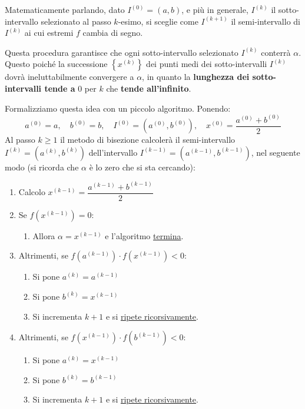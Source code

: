 \highspace
Matematicamente parlando, dato $I^{(0)} = \left(a,b\right)$, e più in generale, $I^{(k)}$ il sotto-intervallo selezionato al passo $k$-esimo, si sceglie come $I^{\left(k+1\right)}$ il semi-intervallo di $I^{(k)}$ ai cui estremi $f$ cambia di segno.

\highspace
Questa procedura garantisce che ogni sotto-intervallo selezionato $I^{(k)}$ conterrà $\alpha$. Questo poiché la successione $\left\{x^{(k)}\right\}$ dei punti medi dei sotto-intervalli $I^{(k)}$ dovrà ineluttabilmente convergere a $\alpha$, in quanto la \textbf{lunghezza dei sotto-intervalli tende a} $0$ per $k$ che \textbf{tende all'infinito}.

\newpage

\noindent
Formalizziamo questa idea con un piccolo algoritmo. Ponendo:
\begin{equation*}
    a^{(0)} = a, \hspace{1em} b^{(0)} = b, \hspace{1em} I^{(0)} = \left(a^{(0)}, b^{(0)}\right), \hspace{1em} x^{(0)} = \dfrac{a^{(0)} + b^{(0)}}{2}
\end{equation*}
Al passo $k \ge 1$ il metodo di bisezione calcolerà il semi-intervallo $I^{(k)} = \left(a^{(k)}, b^{(k)}\right)$ dell'intervallo $I^{(k-1)} = \left(a^{\left(k-1\right)}, b^{\left(k-1\right)}\right)$, nel seguente modo (si ricorda che $\alpha$ è lo zero che si sta cercando):
\begin{enumerate}
    \item Calcolo $x^{\left(k-1\right)} = \dfrac{a^{\left(k-1\right)} + b^{\left(k-1\right)}}{2}$

    \item Se $f\left(x^{\left(k-1\right)}\right) = 0$:
    \begin{enumerate}
        \item Allora $\alpha = x^{\left(k-1\right)}$ e l'algoritmo \underline{termina}.
    \end{enumerate}
    
    \item Altrimenti, se $f\left(a^{\left(k-1\right)}\right) \cdot f\left(x^{\left(k-1\right)}\right) < 0$:
    \begin{enumerate}
        \item Si pone $a^{(k)} = a^{\left(k-1\right)}$
        \item Si pone $b^{(k)} = x^{\left(k-1\right)}$
        \item Si incrementa $k+1$ e si \underline{ripete ricorsivamente}.
    \end{enumerate}
    
    \item Altrimenti, se $f\left(x^{\left(k-1\right)}\right) \cdot f\left(b^{\left(k-1\right)}\right) < 0$:
    \begin{enumerate}
        \item Si pone $a^{(k)} = x^{\left(k-1\right)}$
        \item Si pone $b^{(k)} = b^{\left(k-1\right)}$
        \item Si incrementa $k+1$ e si \underline{ripete ricorsivamente}.
    \end{enumerate}
\end{enumerate}

